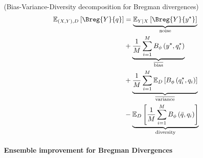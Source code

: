 \documentclass[../main.tex]{subfiles}
\begin{document}

\begin{theorem} (Bias-Variance-Diversity decomposition for Bregman divergences)
    \label{thm:bregman-diversity-decomp}
\begin{align*}
\mathbb{E}_{(X,Y), D}\left[ \Breg{Y}{q} \right]  
&= \underbrace{\mathbb{E}_{Y|X}\left[ \Breg{Y}{y^\star} \right]   }_{\text{noise}} \\
&+
\underbrace{
    \frac{1}{M} \sum_{i=1}^M B_\phi\left(y^\star, q_i^\star \right)
}_{\overline{\text{bias}}} \\
&+
\underbrace{
    \frac{1}{M} \sum_{i=1}^M \mathbb{E}_D\left[B_\phi\left(q_i^\star, q_i\right)\right]
}_{\overline{\text{variance}}} \\
&-
\underbrace{
    \mathbb{E}_D\left[\frac{1}{M} \sum_{i=1}^M B_\phi\left(\bar{q}, q_i\right)\right]
}_{\text{diversity}}
\end{align*}
\end{theorem}




\paragraph{Ensemble improvement for Bregman Divergences}
\end{document}
